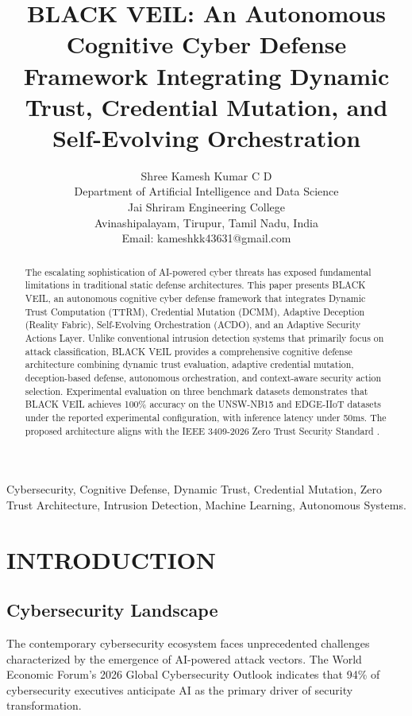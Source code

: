 \documentclass[10pt,journal,compsoc]{IEEEtran}
\begin{document}
\title{BLACK VEIL: An Autonomous Cognitive Cyber Defense Framework Integrating Dynamic Trust, Credential Mutation, and Self-Evolving Orchestration}

\author{Shree Kamesh Kumar C D\\
Department of Artificial Intelligence and Data Science\\
Jai Shriram Engineering College\\
Avinashipalayam, Tirupur, Tamil Nadu, India\\
Email: kameshkk43631@gmail.com}

\maketitle

\begin{abstract}
The escalating sophistication of AI-powered cyber threats has exposed fundamental limitations in traditional static defense architectures. This paper presents BLACK VEIL, an autonomous cognitive cyber defense framework that integrates Dynamic Trust Computation (TTRM), Credential Mutation (DCMM), Adaptive Deception (Reality Fabric), Self-Evolving Orchestration (ACDO), and an Adaptive Security Actions Layer. Unlike conventional intrusion detection systems that primarily focus on attack classification, BLACK VEIL provides a comprehensive cognitive defense architecture combining dynamic trust evaluation, adaptive credential mutation, deception-based defense, autonomous orchestration, and context-aware security action selection. Experimental evaluation on three benchmark datasets \cite{unsw2017,cicids2019,edge2022} demonstrates that BLACK VEIL achieves 100\% accuracy on the UNSW-NB15 and EDGE-IIoT datasets under the reported experimental configuration, with inference latency under 50ms. The proposed architecture aligns with the IEEE 3409-2026 Zero Trust Security Standard \cite{ieee3409}.
\end{abstract}

\begin{IEEEkeywords}
Cybersecurity, Cognitive Defense, Dynamic Trust, Credential Mutation, Zero Trust Architecture, Intrusion Detection, Machine Learning, Autonomous Systems.
\end{IEEEkeywords}

\section{INTRODUCTION}
\subsection{Cybersecurity Landscape}
The contemporary cybersecurity ecosystem faces unprecedented challenges characterized by the emergence of AI-powered attack vectors. The World Economic Forum's 2026 Global Cybersecurity Outlook \cite{wef2026} indicates that 94\% of cybersecurity executives anticipate AI as the primary driver of security transformation.
\end{document}
